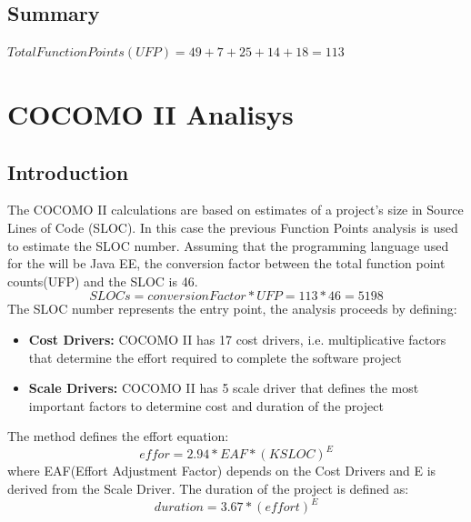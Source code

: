\documentclass[11pt,titlepage]{article} %
\begin{document}
     \subsection{Summary}
	\begin{center}
	$ Total Function Points(UFP) = 49 + 7 + 25 + 14 + 18  = 113 $
	\end{center}

\newpage
\section{COCOMO II Analisys}
  \subsection{Introduction}
    The COCOMO II calculations are based on estimates of a project's size in Source Lines of Code (SLOC).
    In this case the previous Function Points analysis is used to estimate the SLOC number.\newline
    Assuming that the programming language used for the will be Java EE, the conversion factor between the 
    total function point counts(UFP) and the SLOC is 46.
    \begin{equation}
     SLOCs = conversionFactor * UFP = 113 * 46 = 5198
    \end{equation}
    The SLOC number represents the entry point, the analysis proceeds by defining:
    \begin{itemize}
     \item \textbf{Cost Drivers:} COCOMO II has 17 cost drivers, i.e. multiplicative factors that determine the effort required to complete the software project
     \item \textbf{Scale Drivers:} COCOMO II has 5 scale driver that defines the most important factors to determine cost and duration of the project
    \end{itemize}
    The method defines the effort equation:
    \begin{equation}
     effor = 2.94 * EAF * (KSLOC)^E
    \end{equation}
    where EAF(Effort Adjustment Factor) depends on the Cost Drivers and E is derived from the Scale Driver.\newline
    The duration of the project is defined as:
    \begin{equation}
     duration = 3.67 * (effort)^E
    \end{equation}
  \newpage
\end{document}

